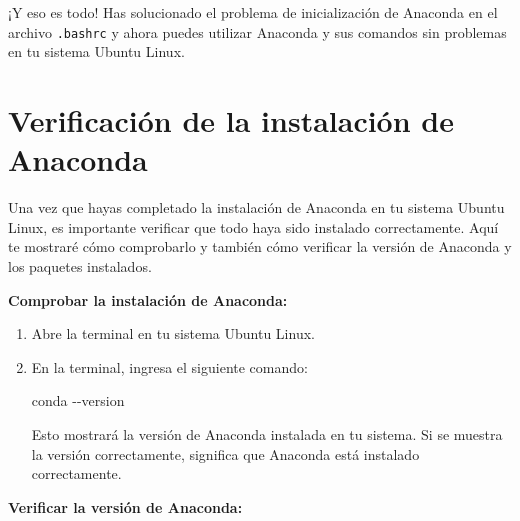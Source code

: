 \documentclass[
  jou,
  floatsintext,
  longtable,
  a4paper,
  nolmodern,
  notxfonts,
  notimes,
  colorlinks=true,linkcolor=blue,citecolor=blue,urlcolor=blue]{apa7}
\newenvironment{Shaded}{\begin{snugshade}}{\end{snugshade}}
\newcommand{\AttributeTok}[1]{\textcolor[rgb]{0.40,0.45,0.13}{#1}}
\newcommand{\ExtensionTok}[1]{\textcolor[rgb]{0.00,0.23,0.31}{#1}}
\begin{document}
¡Y eso es todo! Has solucionado el problema de inicialización de
Anaconda en el archivo \texttt{.bashrc} y ahora puedes utilizar Anaconda
y sus comandos sin problemas en tu sistema Ubuntu Linux.

\section{Verificación de la instalación de
Anaconda}\label{verificaciuxf3n-de-la-instalaciuxf3n-de-anaconda}

Una vez que hayas completado la instalación de Anaconda en tu sistema
Ubuntu Linux, es importante verificar que todo haya sido instalado
correctamente. Aquí te mostraré cómo comprobarlo y también cómo
verificar la versión de Anaconda y los paquetes instalados.

\textbf{Comprobar la instalación de Anaconda:}

\begin{enumerate}
\def\labelenumi{\arabic{enumi}.}
\item
  Abre la terminal en tu sistema Ubuntu Linux.
\item
  En la terminal, ingresa el siguiente comando:

\begin{Shaded}
\begin{Highlighting}[]
\ExtensionTok{conda} \AttributeTok{{-}{-}version}
\end{Highlighting}
\end{Shaded}

  Esto mostrará la versión de Anaconda instalada en tu sistema. Si se
  muestra la versión correctamente, significa que Anaconda está
  instalado correctamente.
\end{enumerate}

\textbf{Verificar la versión de Anaconda:}
\end{document}
